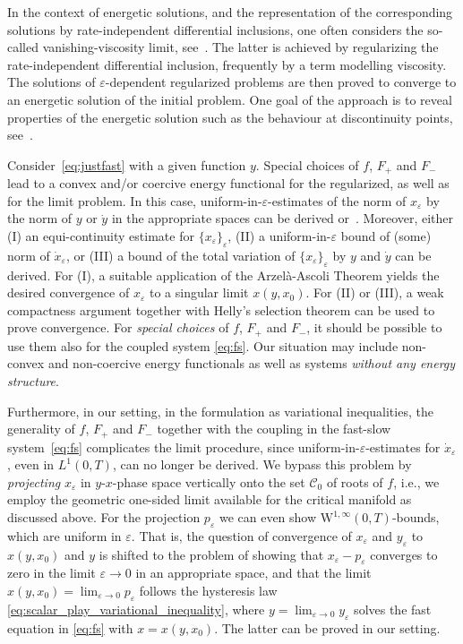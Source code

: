 \documentclass[12pt]{article}
\def\ra{\rightarrow}
\begin{document}
In the context of energetic solutions, and the representation of the 
corresponding solutions by rate-independent differential inclusions, 
one often considers the so-called vanishing-viscosity limit, see~\cite{MielkeRossiSavare}. 
The latter is achieved by regularizing the rate-independent differential 
inclusion, frequently by a term modelling viscosity. The solutions of 
$\varepsilon$-dependent regularized problems are then proved to converge 
to an energetic solution of the initial problem. 
One goal of the approach is to reveal properties of the energetic solution such as the 
behaviour at discontinuity points, see~\cite{MielkeRossiSavare}.\medskip

Consider~\eqref{eq:justfast} with a given function $y$. Special choices of $f$, 
$F_+$ and $F_-$ lead to a convex and/or coercive energy functional for the 
regularized, as well as for the limit problem. In this case, 
uniform-in-$\varepsilon$-estimates of the norm of $x_\varepsilon$ by the norm 
of $y$ or $\dot{y}$ in the appropriate spaces can be 
derived \cite[Chapter 1.7 or Chapter 3.8]{MielkeRoubicek} or~\cite{MielkeRossiSavare}.
Moreover, either (I) an equi-continuity estimate for $\{x_\varepsilon\}_\varepsilon$, 
(II) a uniform-in-$\varepsilon$ bound of (some) norm of $\dot{x}_\varepsilon$, or 
(III) a bound of the total variation of $\{x_\varepsilon\}_\varepsilon$ by $y$ and $\dot{y}$ 
can be derived. For (I), a suitable application of the Arzel\`{a}-Ascoli 
Theorem yields the desired convergence of $x_\varepsilon$ to a singular limit $x(y,x_0)$.
For (II) or (III), a weak compactness argument together with Helly's selection theorem 
can be used to prove convergence. For \emph{special choices} of $f$, $F_+$ and $F_-$, 
it should be possible to use them also for the coupled system \eqref{eq:fs}. Our 
situation may include non-convex and non-coercive energy functionals as well as 
systems \emph{without any energy structure}.\medskip

Furthermore, in our setting, in the formulation as variational inequalities, the generality 
of $f$, $F_+$ and $F_-$ together with the coupling in the fast-slow system~\eqref{eq:fs} 
complicates the limit procedure, since uniform-in-$\varepsilon$-estimates for 
$\dot{x}_\varepsilon$, even in $L^1(0,T)$, can no longer be derived. We bypass this 
problem by \emph{projecting} $x_\varepsilon$ in $y$-$x$-phase space vertically onto
the set $\mathcal{C}_0$ of roots of $f$, i.e., we employ the geometric one-sided limit
available for the critical manifold as discussed above. For the projection $p_\varepsilon$ 
we can even show $\mathrm{W}^{1,\infty}(0,T)$-bounds, which are uniform in $\varepsilon$. 
That is, the question of convergence of $x_\varepsilon$ and $y_\varepsilon$ to $x(y,x_0)$ 
and $y$ is shifted to the problem of showing that $x_\varepsilon - p_\varepsilon$ converges 
to zero in the limit $\varepsilon\rightarrow 0$ in an appropriate space, 
and that the limit $x(y,x_0)=\lim_{\varepsilon\ra 0}p_\varepsilon$ follows the 
hysteresis law \eqref{eq:scalar_play_variational_inequality}, where $y=\lim_{\varepsilon\ra 0}y_\varepsilon$ 
solves the fast equation in \eqref{eq:fs} with $x=x(y,x_0)$. The latter can be proved in our 
setting.\medskip 
\end{document}
